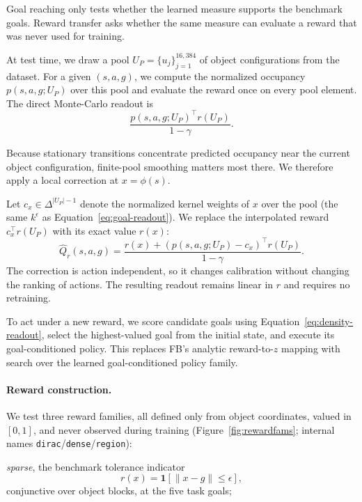 \documentclass{article}
\newcommand{\ind}[1]{\mathbf{1}\!\left[#1\right]}
\begin{document}
Goal reaching only tests whether the learned measure supports the benchmark goals.
Reward transfer asks whether the same measure can evaluate a reward that was never used for training.

At test time, we draw a pool $U_P=\{u_j\}_{j=1}^{16{,}384}$ of object configurations from the dataset.
For a given $(s,a,g)$, we compute the normalized occupancy $p(s,a,g;U_P)$ over this pool and evaluate the reward once on every pool element.
The direct Monte-Carlo readout is
\begin{equation}
    \frac{ p(s,a,g;U_P)^\top r(U_P) }{ 1-\gamma}.
\end{equation}

Because stationary transitions concentrate predicted occupancy near the current object configuration, finite-pool smoothing matters most there.
We therefore apply a local correction at $x=\phi(s).$

Let $ c_x\in\Delta^{|U_P|-1}$ denote the normalized kernel weights of $x$ over the pool (the same $k^\epsilon$ as Equation~\ref{eq:goal-readout}).
We replace the interpolated reward $c_x^\top r(U_P)$ with its exact value $r(x)$:
\begin{equation}
\label{eq:density-readout}
    \widehat Q_r(s,a,g) = \frac{ r(x) + \left( p(s,a,g;U_P)-c_x \right)^\top r(U_P)}{1-\gamma}.
\end{equation}
The correction is action independent, so it changes calibration without changing the ranking of actions.
The resulting readout remains linear in $r$ and requires no retraining.

To act under a new reward, we score candidate goals using Equation~\ref{eq:density-readout}, select the highest-valued goal from the initial state, and execute its goal-conditioned policy.
This replaces FB's analytic reward-to-$z$ mapping with search over the learned goal-conditioned policy family.

\paragraph{Reward construction.}
We test three reward families, all defined only from object coordinates, valued in $[0,1]$, and never observed during training (Figure~\ref{fig:rewardfams}; internal names \texttt{dirac}/\texttt{dense}/\texttt{region}):

\emph{sparse}, the benchmark tolerance indicator
\begin{equation}
    r(x) = \ind{\|x-g\|\le\epsilon},
\end{equation}
conjunctive over object blocks, at the five task goals;
\end{document}
